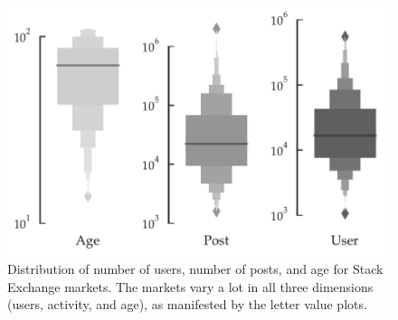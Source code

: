 \begin{figure}[hbt]
\vspace{-\baselineskip}
\centering
\includegraphics[scale=0.45]{Figures/Dataset_Statistics.pdf}
\vspace{-\baselineskip}
\caption{Distribution of number of users, number of posts, and age for Stack Exchange markets. The markets vary a lot in all three dimensions (users, activity, and age), as manifested by the letter value plots.}
\vspace{-\baselineskip}
\label{fig:dataset}
\end{figure}
